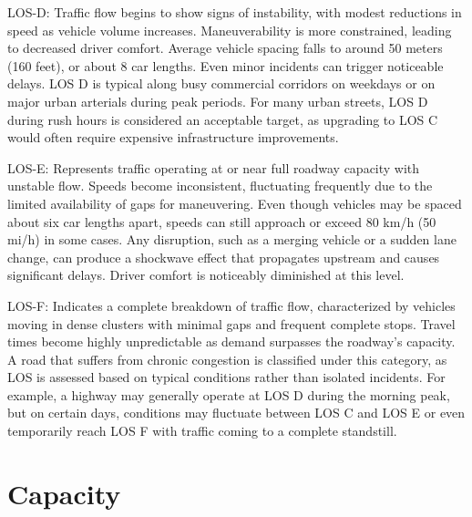 LOS-D: Traffic flow begins to show signs of 
instability, with modest reductions in speed as vehicle 
volume increases. Maneuverability is more constrained, 
leading to decreased driver comfort. Average vehicle spacing 
falls to around 50 meters (160 feet), or about 8 car lengths.
Even minor incidents can trigger noticeable delays. LOS D is 
typical along busy commercial corridors on weekdays or on
major urban arterials during peak periods. For many urban 
streets, LOS D during rush hours is considered an acceptable 
target, as upgrading to LOS C would often require expensive 
infrastructure improvements.

LOS-E: Represents traffic operating at or near full 
roadway capacity with unstable flow. Speeds become 
inconsistent, fluctuating frequently due to the limited 
availability of gaps for maneuvering. Even though vehicles 
may be spaced about six car lengths apart, speeds can still 
approach or exceed 80 km/h (50 mi/h) in some cases. Any 
disruption, such as a merging vehicle or a sudden lane change, 
can produce a shockwave effect that propagates upstream and 
causes significant delays. Driver comfort is noticeably 
diminished at this level.

LOS-F: Indicates a complete breakdown of traffic flow, 
characterized by vehicles moving in dense clusters with 
minimal gaps and frequent complete stops. Travel times 
become highly unpredictable as demand surpasses the roadway's 
capacity. A road that suffers from chronic congestion is 
classified under this category, as LOS is assessed based on 
typical conditions rather than isolated incidents. For 
example, a highway may generally operate at LOS D during the 
morning peak, but on certain days, conditions may fluctuate 
between LOS C and LOS E or even temporarily reach LOS F with 
traffic coming to a complete standstill.


\section{Capacity}

